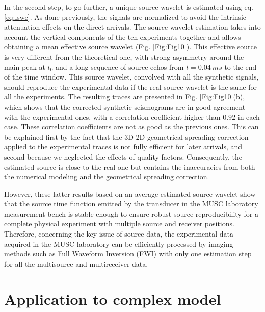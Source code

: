 \documentclass[extra,mreferee]{gji}
\newenvironment{orangenote}{\par\color{Orange}}{\par}
\begin{document}
\begin{orangenote}
In the second step, to go further, a unique source wavelet is estimated using eq. \ref{eq:lswe}. As done previously, the signals are normalized to avoid the intrinsic attenuation effects on the direct arrivals. The source wavelet estimation takes into account the vertical components of the ten experiments together and allows obtaining a mean effective source wavelet (Fig. \ref{Fig:Fig10}). This effective source is very different from the theoretical one, with strong asymmetry around the main peak at $t_{0}$ and a long sequence of source echos from $t=0.04\ ms$ to the end of the time window. This source wavelet, convolved with all the synthetic signals, should reproduce the experimental data if the real source wavelet is the same for all the experiments. The resulting traces are presented in Fig. \ref{Fig:Fig10}(b), which shows that the corrected synthetic seismograms are in good agreement with the experimental ones, with a correlation coefficient higher than $0.92$ in each case. These correlation coefficients are not as good as the previous ones. This can be explained first by the fact that the 3D-2D geometrical spreading correction applied to the experimental traces is not fully efficient for later arrivals, and second because we neglected the effects of quality factors. Consequently, the estimated source is close to the real one but contains the inaccuracies from both the numerical modeling and the geometrical spreading correction. 

However, these latter results based on an average estimated source wavelet show that the source time function emitted by the transducer in the MUSC laboratory measurement bench is stable enough to ensure robust source reproducibility for a complete physical experiment with multiple source and receiver positions. Therefore, concerning the key issue of source data, the experimental data acquired in the MUSC laboratory can be efficiently processed by imaging methods such as Full Waveform Inversion (FWI) with only one estimation step for all the multisource and multireceiver data.

\section{Application to complex model}


\end{orangenote}
\end{document}

